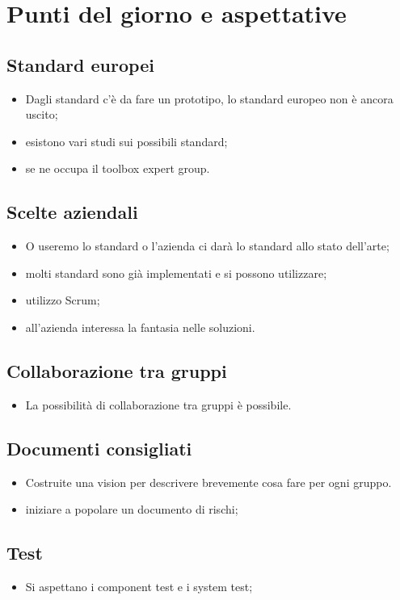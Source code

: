 \section{Punti del giorno e aspettative}

    \subsection{Standard europei}
    \begin{itemize}
        \item Dagli standard c'è da fare un prototipo, lo standard europeo non è ancora uscito;
        \item esistono vari studi sui possibili standard;
        \item se ne occupa il toolbox expert group.
    \end{itemize}
    \subsection{Scelte aziendali}
    \begin{itemize}
        \item O useremo lo standard o l'azienda ci darà lo standard allo stato
         dell'arte;
        \item molti standard sono già implementati e si possono utilizzare;
        \item utilizzo Scrum;
        \item all'azienda interessa la fantasia nelle soluzioni.
    \end{itemize}
    \subsection{Collaborazione tra gruppi}
    \begin{itemize}
        \item La possibilità di collaborazione tra gruppi è possibile.
    \end{itemize}
    \subsection{Documenti consigliati}
    \begin{itemize}
        \item Costruite una vision per descrivere brevemente cosa fare per ogni gruppo.
        \item iniziare a popolare un documento di rischi;
    \end{itemize}
    \subsection{Test }
    \begin{itemize}
        \item Si aspettano i component test e i system test;
    \end{itemize}

